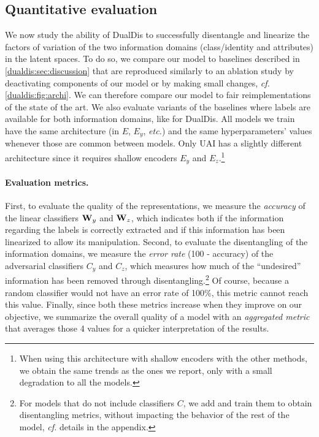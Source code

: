 \subsection{Quantitative evaluation}
\label{dualdis:sec:exp_dis}

We now study the ability of DualDis to successfully disentangle and linearize the factors of variation of the two information domains (class/identity and attributes) in the latent spaces.
To do so, we compare our model to baselines described in \autoref{dualdis:sec:discussion} that are reproduced similarly to an ablation study by deactivating components of our model or by making small changes, \textit{cf.} \autoref{dualdis:fig:archi}. We can therefore compare our model to fair reimplementations of the state of the art. We also evaluate variants of the baselines where labels are available for both information domains, like for DualDis. All models we train have the same architecture (in $E$, $E_y$, \textit{etc.}) and the same hyperparameters' values whenever those are common between models. Only UAI \citep{Jaiswal2018} has a slightly different architecture since it requires shallow encoders $E_y$ and $E_z$.\footnote{When using this architecture with shallow encoders with the other methods, we obtain the same trends as the ones we report, only with a small degradation to all the models.}

\paragraph{Evaluation metrics.} First, to evaluate the quality of the representations, we measure the \textit{accuracy} of the linear classifiers $\mathbf{W}_y$ and $\mathbf{W}_z$, which indicates both if the information regarding the labels is correctly extracted and if this information has been linearized to allow its manipulation. Second, to evaluate the disentangling of the information domains, we measure the \textit{error rate} (100 - accuracy) of the adversarial classifiers $C_y$ and $C_z$, which measures how much of the ``undesired'' information has been removed through disentangling.\footnote{For models that do not include classifiers $C$, we add and train them to obtain disentangling metrics, without impacting the behavior of the rest of the model, \textit{cf.} details in the appendix.} Of course, because a random classifier would not have an error rate of 100\%, this metric cannot reach this value. Finally, since both these metrics increase when they improve on our objective, we summarize the overall quality of a model with an \textit{aggregated metric} that averages those 4 values for a quicker interpretation of the results.


